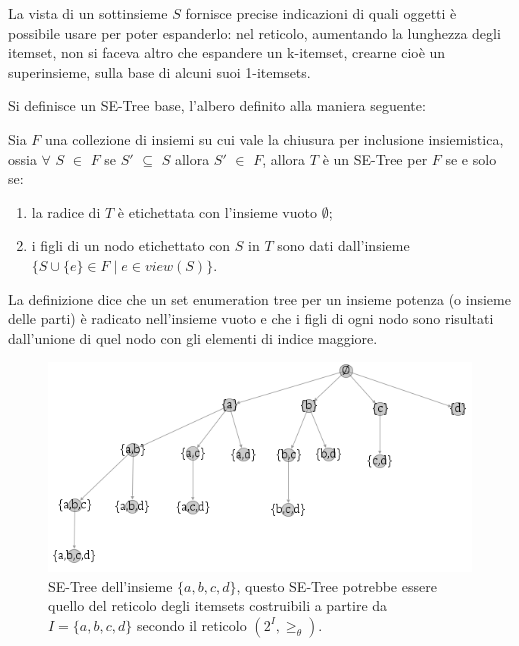 La vista di un sottinsieme $S$ fornisce precise indicazioni di quali oggetti {\`e} possibile usare per poter espanderlo: nel reticolo, aumentando la lunghezza degli itemset, non si faceva altro che espandere un k-itemset, crearne cio{\`e} un superinsieme, sulla base di alcuni suoi 1-itemsets.

Si definisce un SE-Tree base, l'albero definito alla maniera seguente:

\begin{defn}
Sia \( F \) una collezione di insiemi su cui vale la chiusura per inclusione insiemistica, ossia $\forall$ \( S\) $\in$ \( F\) se \( S' \) $\subseteq$ \( S \) allora \( S' \) $\in$ \( F \), allora \( T \) {\`e} un SE-Tree per \( F \) se e solo se:

\begin{enumerate}[label=(\roman*)]
  
\item la radice di \( T \) {\`e} etichettata con l'insieme vuoto $\emptyset$;
\item i figli di un nodo etichettato con \( S \) in \( T \) sono dati dall'insieme \\ $\lbrace S \cup \lbrace e \rbrace \in F \mid e \in view(S) \rbrace$.

\end{enumerate}
\end{defn}

La definizione dice che un set enumeration tree per un insieme potenza (o insieme delle parti) {\`e} radicato nell'insieme vuoto e che i figli di ogni nodo sono risultati dall'unione di quel nodo con gli elementi di indice maggiore.

\begin{figure}\centering
\includegraphics[scale=0.50]{img/se-tree}
\caption{SE-Tree dell'insieme $\lbrace a,b,c,d \rbrace$, questo SE-Tree potrebbe essere quello del reticolo degli itemsets costruibili a partire da $I = \lbrace a,b,c,d \rbrace$ secondo il reticolo $(2^I, \geq_{\theta})$.}
\end{figure}


